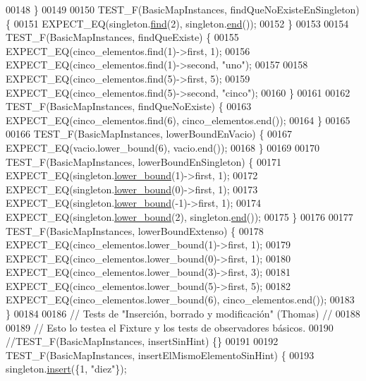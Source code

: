 \begin{DoxyCode}
00148 \}
00149 
00150 TEST\_F(BasicMapInstances, findQueNoExisteEnSingleton) \{
00151     EXPECT\_EQ(singleton.\hyperlink{classaed2_1_1map_afd0fc1a8234888e61e0e615de7e245b8_afd0fc1a8234888e61e0e615de7e245b8}{find}(2), singleton.\hyperlink{classaed2_1_1map_a76023e6a56cb625513e1b5ea028bf983_a76023e6a56cb625513e1b5ea028bf983}{end}());
00152 \}
00153 
00154 TEST\_F(BasicMapInstances, findQueExiste) \{
00155     EXPECT\_EQ(cinco\_elementos.find(1)->first, 1);
00156     EXPECT\_EQ(cinco\_elementos.find(1)->second, \textcolor{stringliteral}{"uno"});
00157 
00158     EXPECT\_EQ(cinco\_elementos.find(5)->first, 5);
00159     EXPECT\_EQ(cinco\_elementos.find(5)->second, \textcolor{stringliteral}{"cinco"});
00160 \}
00161 
00162 TEST\_F(BasicMapInstances, findQueNoExiste) \{
00163     EXPECT\_EQ(cinco\_elementos.find(6), cinco\_elementos.end());
00164 \}
00165 
00166 TEST\_F(BasicMapInstances, lowerBoundEnVacio) \{
00167     EXPECT\_EQ(vacio.lower\_bound(6), vacio.end());
00168 \}
00169 
00170 TEST\_F(BasicMapInstances, lowerBoundEnSingleton) \{
00171     EXPECT\_EQ(singleton.\hyperlink{classaed2_1_1map_a3399d36fdd5a880b494f3a5795d3f18f_a3399d36fdd5a880b494f3a5795d3f18f}{lower\_bound}(1)->first, 1);
00172     EXPECT\_EQ(singleton.\hyperlink{classaed2_1_1map_a3399d36fdd5a880b494f3a5795d3f18f_a3399d36fdd5a880b494f3a5795d3f18f}{lower\_bound}(0)->first, 1);
00173     EXPECT\_EQ(singleton.\hyperlink{classaed2_1_1map_a3399d36fdd5a880b494f3a5795d3f18f_a3399d36fdd5a880b494f3a5795d3f18f}{lower\_bound}(-1)->first, 1);
00174     EXPECT\_EQ(singleton.\hyperlink{classaed2_1_1map_a3399d36fdd5a880b494f3a5795d3f18f_a3399d36fdd5a880b494f3a5795d3f18f}{lower\_bound}(2), singleton.\hyperlink{classaed2_1_1map_a76023e6a56cb625513e1b5ea028bf983_a76023e6a56cb625513e1b5ea028bf983}{end}());
00175 \}
00176 
00177 TEST\_F(BasicMapInstances, lowerBoundExtenso) \{
00178     EXPECT\_EQ(cinco\_elementos.lower\_bound(1)->first, 1);
00179     EXPECT\_EQ(cinco\_elementos.lower\_bound(0)->first, 1);
00180     EXPECT\_EQ(cinco\_elementos.lower\_bound(3)->first, 3);
00181     EXPECT\_EQ(cinco\_elementos.lower\_bound(5)->first, 5);
00182     EXPECT\_EQ(cinco\_elementos.lower\_bound(6), cinco\_elementos.end());
00183 \}
00184 
00186 \textcolor{comment}{// Tests de "Inserción, borrado y modificación" (Thomas) //}
00188 \textcolor{comment}{}
00189 \textcolor{comment}{// Esto lo testea el Fixture y los tests de observadores básicos.}
00190 \textcolor{comment}{//TEST\_F(BasicMapInstances, insertSinHint) \{\}}
00191 
00192 TEST\_F(BasicMapInstances, insertElMismoElementoSinHint) \{
00193     singleton.\hyperlink{classaed2_1_1map_a6941cde9a79c27f054b5c97a587a1854_a6941cde9a79c27f054b5c97a587a1854}{insert}(\{1, \textcolor{stringliteral}{"diez"}\});

\end{DoxyCode}

